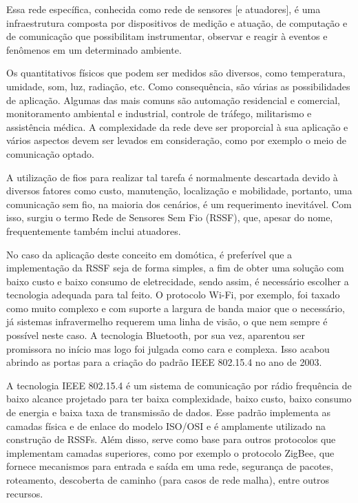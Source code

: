 \documentclass[
    12pt,               %
    a4paper,            %
    english,            %
    brazil,             %
    ]{article}
\begin{document}
Essa rede específica, conhecida como rede de sensores [e atuadores], é uma infraestrutura composta por dispositivos de medição e
atuação, de computação e de comunicação que possibilitam instrumentar, observar e reagir à eventos e fenômenos em um determinado
ambiente. \cite{sohraby_minoli_znati2007}

Os quantitativos físicos que podem ser medidos são diversos, como temperatura, umidade, som, luz, radiação, etc. Como
consequência, são várias as possibilidades de aplicação. Algumas das mais comuns são automação residencial e comercial,
monitoramento ambiental e industrial, controle de tráfego, militarismo e assistência médica. A complexidade da rede deve ser
proporcial à sua aplicação e vários aspectos devem ser levados em consideração, como por exemplo o meio de comunicação optado.
\cite{kuorilehto2007}

A utilização de fios para realizar tal tarefa é normalmente descartada devido à diversos fatores como custo, manutenção,
localização e mobilidade, portanto, uma comunicação sem fio, na maioria dos cenários, é um requerimento inevitável. Com isso,
surgiu o termo Rede de Sensores Sem Fio (RSSF), que, apesar do nome, frequentemente também inclui atuadores.
\cite{karl_willig2005}

No caso da aplicação deste conceito em domótica, é preferível que a implementação da RSSF seja de forma simples, a fim de obter
uma solução com baixo custo e baixo consumo de eletrecidade, sendo assim, é necessário escolher a tecnologia adequada para tal
feito. O protocolo Wi-Fi, por exemplo, foi taxado como muito complexo e com suporte a largura de banda maior que o necessário, já
sistemas infravermelho requerem uma linha de visão, o que nem sempre é possível neste caso. A tecnologia Bluetooth, por sua vez,
aparentou ser promissora no início mas logo foi julgada como cara e complexa. Isso acabou abrindo as portas para a criação do
padrão IEEE 802.15.4 no ano de 2003.  \cite{sohraby_minoli_znati2007}

A tecnologia IEEE 802.15.4 é um sistema de comunicação por rádio frequência de baixo alcance projetado para ter baixa
complexidade, baixo custo, baixo consumo de energia e baixa taxa de transmissão de dados. Esse padrão implementa as camadas física
e de enlace do modelo ISO/OSI e é amplamente utilizado na construção de RSSFs. Além disso, serve como base para outros protocolos
que implementam camadas superiores, como por exemplo o protocolo ZigBee, que fornece mecanismos para entrada e saída em uma rede,
segurança de pacotes, roteamento, descoberta de caminho (para casos de rede malha), entre outros recursos. \cite{buratti2011}
\end{document}
